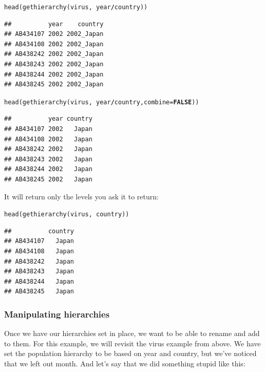 \documentclass[letterpaper]{article}\usepackage[]{graphicx}\usepackage[]{color}
\makeatletter
\newcommand{\hlnum}[1]{\textcolor[rgb]{0.502,0,0.502}{\textbf{#1}}}%
\newcommand{\hlopt}[1]{\textcolor[rgb]{1,0,0.502}{\textbf{#1}}}%
\newcommand{\hlstd}[1]{\textcolor[rgb]{0,0,0}{#1}}%
\newcommand{\hlkwc}[1]{\textcolor[rgb]{0,0.502,0.753}{#1}}%
\newcommand{\hlkwd}[1]{\textcolor[rgb]{0,0.267,0.4}{#1}}%
\newenvironment{kframe}{%
 \def\at@end@of@kframe{}%
 \ifinner\ifhmode%
  \def\at@end@of@kframe{\end{minipage}}%
  \begin{minipage}{\columnwidth}%
 \fi\fi%
 \def\FrameCommand##1{\hskip\@totalleftmargin \hskip-\fboxsep
 \colorbox{shadecolor}{##1}\hskip-\fboxsep
     \hskip-\linewidth \hskip-\@totalleftmargin \hskip\columnwidth}%
 \MakeFramed {\advance\hsize-\width
   \@totalleftmargin\z@ \linewidth\hsize
   \@setminipage}}%
 {\par\unskip\endMakeFramed%
 \at@end@of@kframe}
\newenvironment{knitrout}{}{} %
\makeatother
\begin{document}
\begin{knitrout}\footnotesize
{}\color{fgcolor}\begin{kframe}
\begin{alltt}
\hlkwd{head}\hlstd{(}\hlkwd{gethierarchy}\hlstd{(virus,} \hlopt{~}\hlstd{year}\hlopt{/}\hlstd{country))}
\end{alltt}
\begin{verbatim}
##          year    country
## AB434107 2002 2002_Japan
## AB434108 2002 2002_Japan
## AB438242 2002 2002_Japan
## AB438243 2002 2002_Japan
## AB438244 2002 2002_Japan
## AB438245 2002 2002_Japan
\end{verbatim}
\begin{alltt}
\hlkwd{head}\hlstd{(}\hlkwd{gethierarchy}\hlstd{(virus,} \hlopt{~}\hlstd{year}\hlopt{/}\hlstd{country,} \hlkwc{combine} \hlstd{=} \hlnum{FALSE}\hlstd{))}
\end{alltt}
\begin{verbatim}
##          year country
## AB434107 2002   Japan
## AB434108 2002   Japan
## AB438242 2002   Japan
## AB438243 2002   Japan
## AB438244 2002   Japan
## AB438245 2002   Japan
\end{verbatim}
\end{kframe}
\end{knitrout}


It will return only the levels you ask it to return:

\begin{knitrout}\footnotesize
{}\color{fgcolor}\begin{kframe}
\begin{alltt}
\hlkwd{head}\hlstd{(}\hlkwd{gethierarchy}\hlstd{(virus,} \hlopt{~}\hlstd{country))}
\end{alltt}
\begin{verbatim}
##          country
## AB434107   Japan
## AB434108   Japan
## AB438242   Japan
## AB438243   Japan
## AB438244   Japan
## AB438245   Japan
\end{verbatim}
\end{kframe}
\end{knitrout}


\subsubsection{Manipulating hierarchies}\label{data.manip:hier:manip}

Once we have our hierarchies set in place, we want to be able to rename and add
to them. For this example, we will revisit the virus example from above. We have
set the population hierarchy to be based on year and country, but we've noticed
that we left out month. And let's say that we did something stupid like this:
\end{document}
